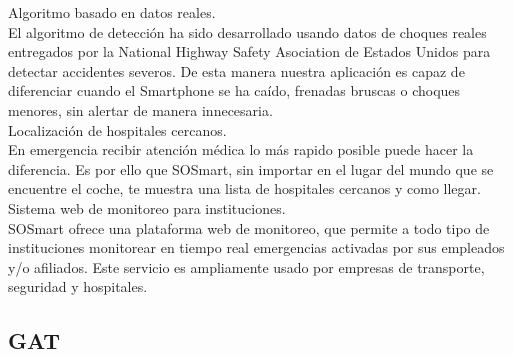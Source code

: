 Algoritmo basado en datos reales.\\
El algoritmo de detección ha sido desarrollado usando datos de choques reales entregados por la National Highway Safety Asociation de Estados Unidos para detectar accidentes severos.  De esta manera nuestra aplicación es capaz de diferenciar cuando el Smartphone se ha caído, frenadas bruscas o choques menores, sin alertar de manera innecesaria.\\

Localización de hospitales cercanos.\\
En emergencia recibir atención médica lo más rapido posible puede hacer la diferencia. Es por ello que SOSmart, sin importar en el lugar del mundo que se encuentre el coche, te muestra una lista de hospitales cercanos y como llegar.\\

Sistema web de monitoreo para instituciones.\\
SOSmart ofrece una plataforma web de monitoreo, que permite a todo tipo de instituciones monitorear en tiempo real emergencias activadas por sus empleados y/o afiliados.  Este servicio es ampliamente usado por empresas de transporte, seguridad y hospitales.\\
\subsection{GAT}

